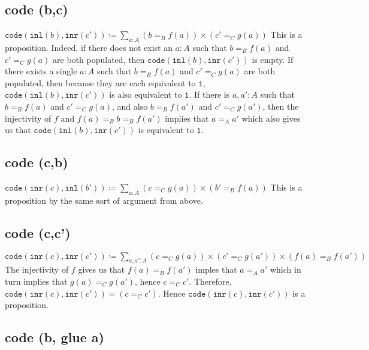 \documentclass[12pt]{amsart}
\newcommand{\type}[1]{\mathtt{#1}}
\newcommand{\inl}{\type{inl}}
\newcommand{\inr}{\type{inr}}
\theoremstyle{remark}
\theoremstyle{definition}
\begin{document}
\pagebreak
\subsection*{code (b,c)}

$
	\type{ code } \left( \inl( b ) , \inr( c' ) \right) \coloneqq
	\sum_{ a : A } ( b =_B f ( a ) ) \times ( c' =_C g ( a ) )
$
This is a proposition. 
Indeed, if there does not exist an $ a : A $ such that
$ b =_B f ( a )$ and $ c' =_C g ( a ) $
are both populated, then 
$ \type{ code } \left( \inl( b ) , \inr( c' ) \right) $ 
is empty. 
If there exists a single $a : A$ such that 
$ b =_B f ( a )$ and $ c' =_C g ( a ) $
are both populated, then 
because they are each equivalent to $ \type{ 1 }$,
$ \type{ code } \left( \inl( b ) , \inr( c' ) \right) $ 
is also equivalent to $ \type{ 1 }$.
If there is $a, a' : A$ such that
$ b =_B f ( a )$ and $ c' =_C g ( a ) $,
and also 
$ b =_B f ( a' )$ and $ c' =_C g ( a' ) $,
then the injectivity of $f$ and
$f ( a ) =_B b =_B f ( a' )$ 
implies that
$a =_A a'$
which also gives us that 
$ \type{ code } \left( \inl( b ) , \inr( c' ) \right) $ 
is equivalent to $ \type{ 1 }$.

\pagebreak
\subsection*{code (c,b)}

	$ \type{ code } \left( \inr( c ) , \inl( b' ) \right) \coloneqq \sum_{ a : A } ( c =_C g ( a ) ) \times ( b' =_B f ( a ) ) $
	This is a proposition by the same sort of argument from above.

\pagebreak
\subsection*{code (c,c')}

	$ \type{ code } \left( \inr( c ) , \inr( c' ) \right) \coloneqq \sum_{ a , a' : A } ( c =_C g ( a ) ) \times ( c' =_C g ( a' ) ) \times ( f ( a ) =_B f ( a' ) ) $ 	
	The injectivity of $f$ gives us that 
	$ f ( a ) =_B f ( a' ) $
	imples that 
	$ a =_A a'$
	which in turn implies that
	$ g ( a ) =_C g ( a' )$,
	hence 
	$ c =_C c'$.
	Therefore, 
	$
	\type{ code } \left( \inr( c ) , \inr( c' ) \right) =	
	\left( c =_C c'  \right). 
	$
	Hence 
	$ \type{ code } \left( \inr( c ) , \inr( c' ) \right) $
	is a proposition.

\pagebreak
\subsection*{code (b, glue a)}
\end{document}
